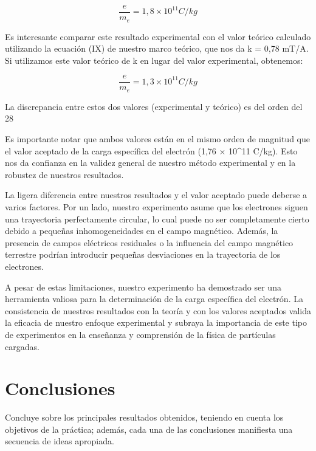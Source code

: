 \documentclass[twocolumn,a4paper,11pt]{scrartcl}
\begin{document}
\begin{equation}
\frac{e}{m_e} = 1,8 \times 10^{11} C/kg
\end{equation}

Es interesante comparar este resultado experimental con el valor teórico calculado utilizando la ecuación (IX) de nuestro marco teórico, que nos da k = 0,78 mT/A. Si utilizamos este valor teórico de k en lugar del valor experimental, obtenemos:

\begin{equation}
\frac{e}{m_e} = 1,3 \times 10^{11} C/kg
\end{equation}

La discrepancia entre estos dos valores (experimental y teórico) es del orden del 28%

Es importante notar que ambos valores están en el mismo orden de magnitud que el valor aceptado de la carga específica del electrón (1,76 × 10^11 C/kg). Esto nos da confianza en la validez general de nuestro método experimental y en la robustez de nuestros resultados.

La ligera diferencia entre nuestros resultados y el valor aceptado puede deberse a varios factores. Por un lado, nuestro experimento asume que los electrones siguen una trayectoria perfectamente circular, lo cual puede no ser completamente cierto debido a pequeñas inhomogeneidades en el campo magnético. Además, la presencia de campos eléctricos residuales o la influencia del campo magnético terrestre podrían introducir pequeñas desviaciones en la trayectoria de los electrones.

A pesar de estas limitaciones, nuestro experimento ha demostrado ser una herramienta valiosa para la determinación de la carga específica del electrón. La consistencia de nuestros resultados con la teoría y con los valores aceptados valida la eficacia de nuestro enfoque experimental y subraya la importancia de este tipo de experimentos en la enseñanza y comprensión de la física de partículas cargadas.

\section{Conclusiones}
Concluye sobre los principales resultados obtenidos, teniendo en cuenta los objetivos de la práctica; además, cada una de las conclusiones manifiesta una secuencia de ideas apropiada.


  
\end{document}

